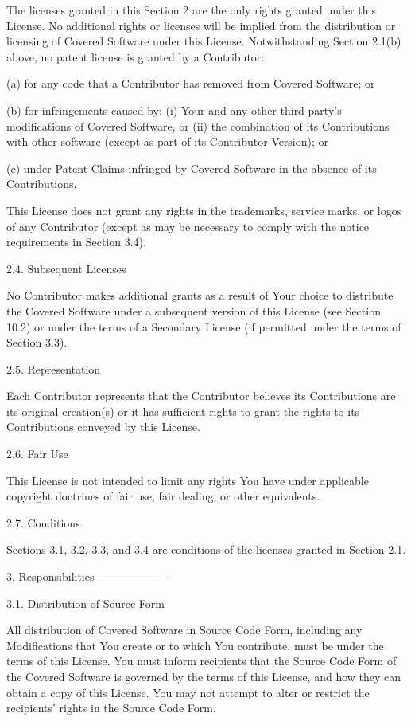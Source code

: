 \begin{DoxyVerb}
The licenses granted in this Section 2 are the only rights granted under
this License. No additional rights or licenses will be implied from the
distribution or licensing of Covered Software under this License.
Notwithstanding Section 2.1(b) above, no patent license is granted by a
Contributor:

(a) for any code that a Contributor has removed from Covered Software;
 or

(b) for infringements caused by: (i) Your and any other third party's
 modifications of Covered Software, or (ii) the combination of its
 Contributions with other software (except as part of its Contributor
 Version); or

(c) under Patent Claims infringed by Covered Software in the absence of
 its Contributions.

This License does not grant any rights in the trademarks, service marks,
or logos of any Contributor (except as may be necessary to comply with
the notice requirements in Section 3.4).

2.4. Subsequent Licenses

No Contributor makes additional grants as a result of Your choice to
distribute the Covered Software under a subsequent version of this
License (see Section 10.2) or under the terms of a Secondary License (if
permitted under the terms of Section 3.3).

2.5. Representation

Each Contributor represents that the Contributor believes its
Contributions are its original creation(s) or it has sufficient rights
to grant the rights to its Contributions conveyed by this License.

2.6. Fair Use

This License is not intended to limit any rights You have under
applicable copyright doctrines of fair use, fair dealing, or other
equivalents.

2.7. Conditions

Sections 3.1, 3.2, 3.3, and 3.4 are conditions of the licenses granted
in Section 2.1.

3. Responsibilities
-------------------

3.1. Distribution of Source Form

All distribution of Covered Software in Source Code Form, including any
Modifications that You create or to which You contribute, must be under
the terms of this License. You must inform recipients that the Source
Code Form of the Covered Software is governed by the terms of this
License, and how they can obtain a copy of this License. You may not
attempt to alter or restrict the recipients' rights in the Source Code
Form.


\end{DoxyVerb}
